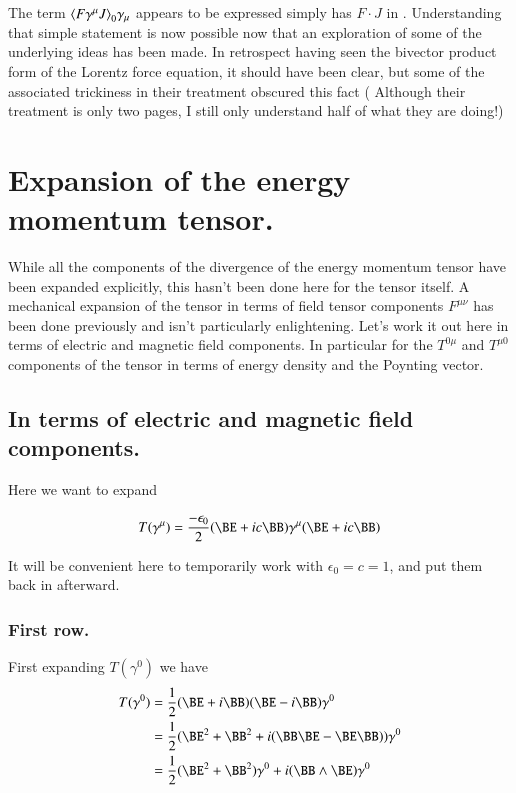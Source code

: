 The term ${\left\langle{{ F \gamma^\mu J }}\right\rangle}_{0} \gamma_\mu $ appears to be expressed simply has $F \cdot J$ in
\cite{doran2003gap}.  Understanding that simple statement is now possible now that an exploration
of some of the underlying ideas has been made.  In retrospect having seen the bivector product form of the Lorentz force equation, it should have been 
clear, but some of the associated trickiness in their treatment obscured this
fact ( Although their treatment is only two pages, I still only 
understand half of what they are doing!)


\section{Expansion of the energy momentum tensor. }

While all the components of the divergence of the energy momentum tensor have been expanded explicitly, this hasn't been
done here for the tensor itself.  A mechanical expansion of the tensor in terms of field tensor components $F^{\mu\nu}$ has been 
done previously and isn't particularly enlightening.  Let's work it out here in terms of electric and magnetic field components.  In particular for the $T^{0\mu}$ and $T^{\mu0}$ components of the tensor in terms of energy density and the Poynting vector.

\subsection{In terms of electric and magnetic field components. }

Here we want to expand 

\begin{align*}
T(\gamma^\mu) = \frac{-\epsilon_0}{2} (\BE + i c \BB) \gamma^\mu (\BE + i c \BB)
\end{align*}

It will be convenient here to temporarily work with $\epsilon_0 = c = 1$, and put them back in afterward.

\subsubsection{First row. } 

First expanding $T(\gamma^0)$ we have
\begin{align*}
T(\gamma^0) 
&= \frac{1}{2} (\BE + i \BB) (\BE - i \BB) \gamma^0 \\
&= \frac{1}{2} (\BE^2 + \BB^2 + i (\BB \BE - \BE \BB)) \gamma^0 \\
&= \frac{1}{2} (\BE^2 + \BB^2) \gamma^0 + i ( \BB \wedge \BE ) \gamma^0 \\
\end{align*}

